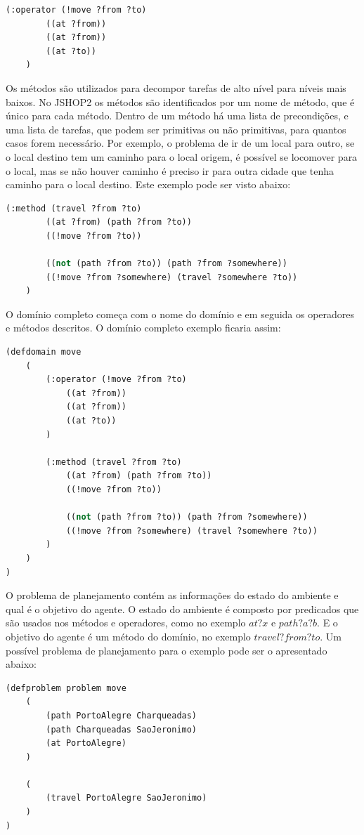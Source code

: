 \lstset{style=codeStyle}
\begin{lstlisting}[language=lisp]
	(:operator (!move ?from ?to) 
		((at ?from)) 
		((at ?from))
		((at ?to))
	)
\end{lstlisting}

Os métodos são utilizados para decompor tarefas de alto nível para níveis mais baixos. No JSHOP2 os métodos são identificados por um nome de método, que é único para cada método. Dentro de um método há uma lista de precondições, e uma lista de tarefas, que podem ser primitivas ou não primitivas, para quantos casos forem necessário. Por exemplo, o problema de ir de um local para outro, se o local destino tem um caminho para o local origem, é possível se locomover para o local, mas se não houver caminho é preciso ir para outra cidade que tenha caminho para o local destino. Este exemplo pode ser visto abaixo:

\lstset{style=codeStyle}
\begin{lstlisting}[language=lisp]
	(:method (travel ?from ?to)
		((at ?from) (path ?from ?to))
		((!move ?from ?to))
		
		((not (path ?from ?to)) (path ?from ?somewhere))
		((!move ?from ?somewhere) (travel ?somewhere ?to))
	)
\end{lstlisting}

O domínio completo começa com o nome do domínio e em seguida os operadores e métodos descritos. O domínio completo exemplo ficaria assim: 

\lstset{style=codeStyle}
\begin{lstlisting}[language=lisp]
(defdomain move
	(
		(:operator (!move ?from ?to) 
			((at ?from)) 
			((at ?from))
			((at ?to))
		)
	
		(:method (travel ?from ?to)
			((at ?from) (path ?from ?to))
			((!move ?from ?to))
		
			((not (path ?from ?to)) (path ?from ?somewhere))
			((!move ?from ?somewhere) (travel ?somewhere ?to))
		)    
	)
)
\end{lstlisting}

O problema de planejamento contém as informações do estado do ambiente e qual é o objetivo do agente. 
O estado do ambiente é composto por predicados que são usados nos métodos e operadores, como no exemplo $at ?x$ e $path ?a ?b$. E o objetivo do agente é um método do domínio, no exemplo $travel ?from ?to$. Um possível problema de planejamento para o exemplo pode ser o apresentado abaixo:


\begin{lstlisting}[language=lisp]
(defproblem problem move
	( 
		(path PortoAlegre Charqueadas)
		(path Charqueadas SaoJeronimo)
		(at PortoAlegre)
	)
	
	(
		(travel PortoAlegre SaoJeronimo)
	)
)
\end{lstlisting}

